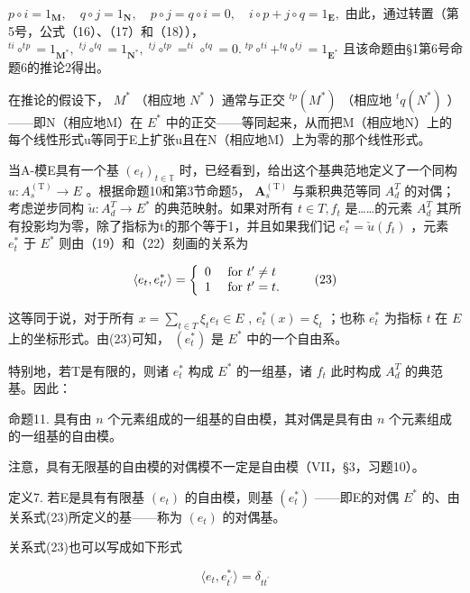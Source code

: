 \(p \circ i = 1_{\mathbf{M}}, \quad q \circ j = 1_{\mathbf{N}}, \quad p \circ j = q \circ i = 0, \quad i \circ p + j \circ q = 1_{\mathbf{E}},\) 由此，通过转置（第5号，公式（16）、（17）和（18））， \(^{ti} \circ ^{tp} = 1_{\mathbf{M}^*}, \; ^{tj} \circ ^{tq} = 1_{\mathbf{N}^*}, \; ^{tj} \circ ^{tp} = ^{ti} \circ ^{tq} = 0. \; ^{tp} \circ ^{ti} + ^{tq} \circ ^{tj} = 1_{\mathbf{E}^*}\) 且该命题由§1第6号命题6的推论2得出。

在推论的假设下， \(M^{*}\) （相应地 \(N^{*}\) ）通常与正交 \(^{tp}(M^{*})\) （相应地 \(^{t}q(N^{*})\) ）——即N（相应地M）在 \(E^{*}\) 中的正交——等同起来，从而把M（相应地N）上的每个线性形式u等同于E上扩张u且在N（相应地M）上为零的那个线性形式。

当A-模E具有一个基 \((e_{t})_{t\in\mathbb{T}}\) 时，已经看到，给出这个基典范地定义了一个同构 \(u:A_{s}^{\mathrm{(T)}}\to E\) 。根据命题10和第3节命题5， \(\mathbf{A}_{s}^{\mathrm{(T)}}\) 与乘积典范等同 \(A_{d}^{T}\) 的对偶；考虑逆步同构 \(\check{u}:A_{d}^{T}\to E^{*}\) 的典范映射。如果对所有 \(t\in T,f_{t}\) 是……的元素 \(A_{d}^{T}\) 其所有投影均为零，除了指标为t的那个等于1，并且如果我们记 \(e_{t}^{*}=\check{u}(f_{t})\) ，元素 \(e_{t}^{*}\) 于 \(E^{*}\) 则由（19）和（22）刻画的关系为

\[
\langle e _ {t}, e _ {t ^ {\prime}} ^ {*} \rangle = \left\{ \begin{array}{l l} 0 & \text { for } t ^ {\prime} \neq t \\ 1 & \text { for } t ^ {\prime} = t. \end{array} \right.\tag{23}
\]

这等同于说，对于所有 \(x = \sum_{t \in T} \xi_t e_t \in E\) , \(e_t^*(x) = \xi_t\) ；也称 \(e_t^*\) 为指标 \(t\) 在 \(E\) 上的坐标形式。由(23)可知， \((e_t^*)\) 是 \(E^*\) 中的一个自由系。

特别地，若T是有限的，则诸 \(e_{t}^{*}\) 构成 \(E^{*}\) 的一组基，诸 \(f_{t}\) 此时构成 \(A_{d}^{T}\) 的典范基。因此：

命题11. 具有由 \(n\) 个元素组成的一组基的自由模，其对偶是具有由 \(n\) 个元素组成的一组基的自由模。

注意，具有无限基的自由模的对偶模不一定是自由模（VII，§3，习题10）。

定义7. 若E是具有有限基 \((e_{t})\) 的自由模，则基 \((e_{t}^{*})\) ——即E的对偶 \(E^{*}\) 的、由关系式(23)所定义的基——称为 \((e_{t})\) 的对偶基。

关系式(23)也可以写成如下形式

\[
\langle e _ {t}, e _ {t ^ {\prime}} ^ {*} \rangle = \delta_ {t t ^ {\prime}}\tag{24}
\]

